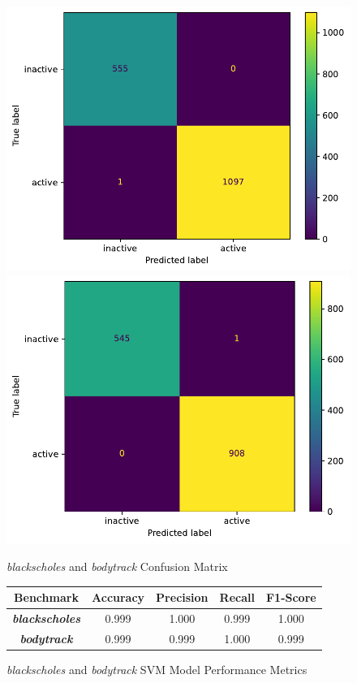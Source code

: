 \documentclass{article}
\begin{document}
\begin{figure} [!htb]
    \centering
    \caption{\textit{blackscholes} and \textit{bodytrack} Confusion Matrix}
    \includegraphics[scale=0.5]{blk_confusion.pdf}
    \includegraphics[scale=0.5]{body_confusion.pdf}
    \label{fig:blk-body-confusion}
\end{figure}

\begin{figure} [!htb]
    \centering
    \caption{\textit{blackscholes} and \textit{bodytrack} SVM Model Performance Metrics}
    \begin{tabular}[!htb]{|c|c|c|c|c|} \hline
        Benchmark & Accuracy & Precision & Recall & F1-Score \\ \hline
        \textit{\textbf{blackscholes}} & 0.999 & 1.000 & 0.999 & 1.000 \\ \hline
        \textit{\textbf{bodytrack}} & 0.999 & 0.999 & 1.000 & 0.999 \\ \hline
    \end{tabular}
    \label{fig:power-svm}
\end{figure}
\end{document}
